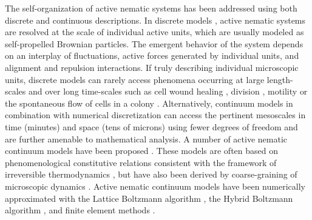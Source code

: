 \documentclass[12pt]{iopart}
\begin{document}
	The self-organization of active nematic systems has been addressed using both discrete and continuous descriptions. In discrete models \cite{bechinger2016, patelli2019, alaimo2017, ehrig2017,keber2014,khoromskaia2017,ellis2018}, active nematic systems are resolved at the scale of individual active units, which are usually modeled as self-propelled Brownian particles. The emergent behavior of the system depends on an interplay of fluctuations, active forces generated by individual units, and  alignment and repulsion interactions.  If truly describing individual microscopic units, discrete models can rarely access phenomena occurring at large length-scales and over long time-scales such as cell wound healing \cite{mandato2001}, division \cite{anne2016}, motility \cite{Ruprecht:2015aa} or the spontaneous flow of cells in a colony \cite{duclos2017}. Alternatively, continuum models in combination with numerical discretization can access the pertinent  mesoscales in time (minutes) and space (tens of microns) using fewer degrees of freedom and are further amenable to mathematical analysis. A number of active nematic continuum models have been proposed \cite{vcopar2019,zhang2020, napoli2020,pearce2020,nestler2018,hemingway2016,julicher2018,metselaar2019}. These models are often based on phenomenological constitutive relations consistent with the framework of irreversible thermodynamics \cite{simha2002,hatwalne2004,julicher2018, salbreux2022}, but have also been derived by coarse-graining of  microscopic dynamics \cite{patelli2019, baskaran2008,bertin2013,peshkov2012}. Active nematic continuum models have been  numerically approximated with  the Lattice Boltzmann algorithm \cite{marenduzzo2007,cates2009}, the Hybrid Boltzmann algorithm \cite{desplat2001},  and finite element methods \cite{goudiaby2021,becker2008, norton2018}. 
	
\end{document}
